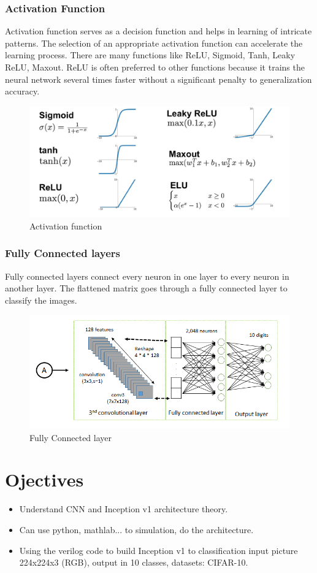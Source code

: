 \documentclass[12pt]{report}
\begin{document}
	\subsection{Activation Function}
	Activation function serves as a decision function and helps in learning of intricate patterns. The
	selection of an appropriate activation function can accelerate the learning process. There are many functions like ReLU, Sigmoid, Tanh, Leaky ReLU, Maxout. ReLU is often preferred to other functions because it trains the neural network several times faster without a significant penalty to generalization accuracy.
	\begin{figure}[h]
		\includegraphics[width=\columnwidth]{activation-functions.png}\caption{Activation function}\label{fig=active}
	\end{figure}
	\subsection{Fully Connected layers}
	Fully connected layers connect every neuron in one layer to every neuron in another layer. The flattened matrix goes through a fully connected layer to classify the images.
	\begin{figure}[h]
		\includegraphics[width=\textwidth]{full.png}\caption{Fully Connected layer}\label{fig:full}
	\end{figure}
	
	\chapter{Ojectives}
	\begin{itemize}
		\item Understand CNN and Inception v1 architecture theory.
		\item Can use python, mathlab... to simulation, do the architecture.
		\item Using the verilog code to build Inception v1 to classification input picture 224x224x3 (RGB), output in 10 classes, datasets: CIFAR-10.
	\end{itemize}
	
\end{document}
